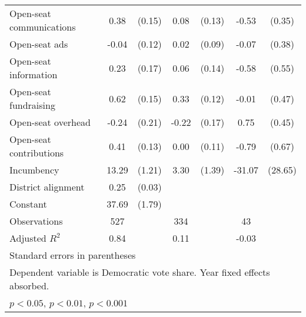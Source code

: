 \begin{table}[htbp]
\begin{tabular}{l*{3}{cc}}
Open-seat communications&        0.38\sym{*}  &      (0.15)&        0.08         &      (0.13)&       -0.53         &      (0.35)\\
Open-seat ads       &       -0.04         &      (0.12)&        0.02         &      (0.09)&       -0.07         &      (0.38)\\
Open-seat information&        0.23         &      (0.17)&        0.06         &      (0.14)&       -0.58         &      (0.55)\\
Open-seat fundraising&        0.62\sym{***}&      (0.15)&        0.33\sym{**} &      (0.12)&       -0.01         &      (0.47)\\
Open-seat overhead  &       -0.24         &      (0.21)&       -0.22         &      (0.17)&        0.75         &      (0.45)\\
Open-seat contributions&        0.41\sym{**} &      (0.13)&        0.00         &      (0.11)&       -0.79         &      (0.67)\\
Incumbency          &       13.29\sym{***}&      (1.21)&        3.30\sym{*}  &      (1.39)&      -31.07         &     (28.65)\\
District alignment  &        0.25\sym{***}&      (0.03)&                     &            &                     &            \\
Constant            &       37.69\sym{***}&      (1.79)&                     &            &                     &            \\
\midrule
Observations        &         527         &            &         334         &            &          43         &            \\
Adjusted \(R^{2}\)  &        0.84         &            &        0.11         &            &       -0.03         &            \\
\bottomrule
\multicolumn{7}{l}{\footnotesize Standard errors in parentheses}\\
\multicolumn{7}{l}{\footnotesize Dependent variable is Democratic vote share. Year fixed effects absorbed.}\\
\multicolumn{7}{l}{\footnotesize \sym{*} \(p<0.05\), \sym{**} \(p<0.01\), \sym{***} \(p<0.001\)}\\
\end{tabular}
\end{table}
